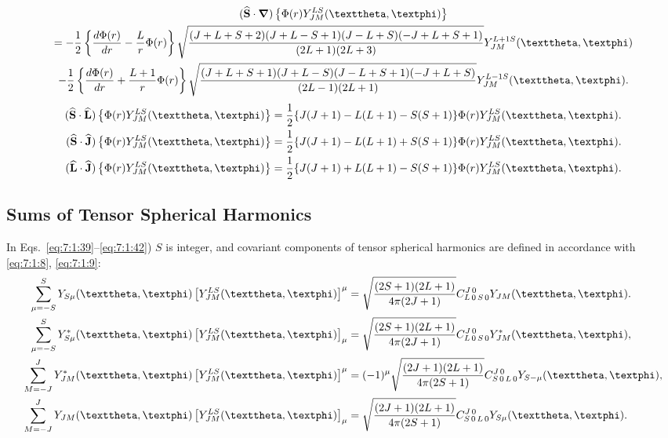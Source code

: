 \begin{enumerate}[label=(\alph*)]
\begin{multline}
(\widehat{\vect{S}}\cdot \boldsymbol{\nabla})\left\{\Phi(r) Y_{J M}^{L S}(\vartheta, \varphi)\right\} \\
=-\frac{1}{2}\left\{\frac{d \Phi(r)}{d r}-\frac{L}{r} \Phi(r)\right\} \sqrt{\frac{(J+L+S+2)(J+L-S+1)(J-L+S)(-J+L+S+1)}{(2 L+1)(2 L+3)}} Y_{J M}^{L+1 S}(\vartheta, \varphi)  \\
-\frac{1}{2}\left\{\frac{d \Phi(r)}{d r}+\frac{L+1}{r} \Phi(r)\right\} \sqrt{\frac{(J+L+S+1)(J+L-S)(J-L+S+1)(-J+L+S)}{(2 L-1)(2 L+1)}} Y_{J M}^{L-1 S}(\vartheta, \varphi). \label{eq:7:1:35}
\end{multline}
\begin{align}
(\widehat{\vect{S}} \cdot \widehat{\vect{L}})\left\{\Phi(r) Y_{J M}^{L S}(\vartheta, \varphi)\right\}&=\frac{1}{2}\{J(J+1)-L(L+1)-S(S+1)\} \Phi(r) Y_{J M}^{L S}(\vartheta, \varphi). \label{eq:7:1:36}\\
(\widehat{\vect{S}} \cdot \widehat{\vect{J}})\left\{\Phi(r) Y_{J M}^{L S}(\vartheta, \varphi)\right\}&=\frac{1}{2}\{J(J+1)-L(L+1)+S(S+1)\} \Phi(r) Y_{J M}^{L S}(\vartheta, \varphi). \label{eq:7:1:37}\\
(\widehat{\vect{L}} \cdot \widehat{\vect{J}})\left\{\Phi(r) Y_{J M}^{L S}(\vartheta, \varphi)\right\}&=\frac{1}{2}\{J(J+1)+L(L+1)-S(S+1)\} \Phi(r) Y_{J M}^{L S}(\vartheta, \varphi). \label{eq:7:1:38}
\end{align}
\end{enumerate}

\subsection{Sums of Tensor Spherical Harmonics}\label{sec:7.1.7}
In Eqs.~\eqref{eq:7:1:39}--\eqref{eq:7:1:42}) $S$ is integer, and covariant components of tensor spherical harmonics are defined in accordance with \eqref{eq:7:1:8}, \eqref{eq:7:1:9}:
\begin{align}
\sum_{\mu=-S}^{S} Y_{S \mu}(\vartheta, \varphi)\left[Y_{J M}^{L S}(\vartheta, \varphi)\right]^{\mu}&=\sqrt{\frac{(2 S+1)(2 L+1)}{4 \pi(2 J+1)}} \clebsch{L}{0}{S}{0}{J}{0} Y_{J M}(\vartheta, \varphi). \label{eq:7:1:39}\\
 \sum_{\mu=-S}^{S} Y_{S \mu}^{*}(\vartheta, \varphi)\left[Y_{J M}^{L S}(\vartheta, \varphi)\right]_{\mu}&=\sqrt{\frac{(2 S+1)(2 L+1)}{4 \pi(2 J+1)}} \clebsch{L}{0}{S}{0}{J}{0} Y_{J M}^{*}(\vartheta, \varphi), \label{eq:7:1:40}\\
 \sum_{M=-J}^{J} Y_{J M}^{*}(\vartheta, \varphi)\left[Y_{J M}^{L S}(\vartheta, \varphi)\right]^{\mu}&=(-1)^{\mu} \sqrt{\frac{(2 J+1)(2 L+1)}{4 \pi(2 S+1)}} \clebsch{S}{0}{L}{0}{J}{0} Y_{S-\mu}(\vartheta, \varphi), \label{eq:7:1:41}\\
 \sum_{M=-J}^{J} Y_{J M}(\vartheta, \varphi)\left[Y_{J M}^{L S}(\vartheta, \varphi)\right]_{\mu}&=\sqrt{\frac{(2 J+1)(2 L+1)}{4 \pi(2 S+1)}} \clebsch{S}{0}{L}{0}{J}{0} Y_{S \mu}(\vartheta, \varphi). \label{eq:7:1:42}
\end{align}
